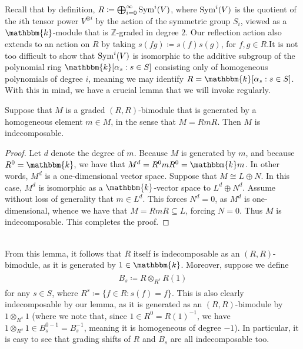 \noindent Recall that by definition, $R \coloneqq \bigoplus_{i=0}^\infty\textup{Sym}^i(V)$, where $\textup{Sym}^i(V)$ is the quotient of the $i$th tensor power $V^{\otimes i}$ by the action of the symmetric group $S_i$, viewed as a $\mathbbm{k}$-module that is $\mathbb{Z}$-graded in degree $2$. Our reflection action also extends to an action on $R$ by taking $s(fg) \coloneqq s(f)s(g)$, for $f, g \in R$.\linebreak It is not too difficult to show that $\textup{Sym}^i(V)$ is isomorphic to the additive subgroup of the polynomial ring $\mathbbm{k}[\alpha_s : s \in S]$ consisting only of homogeneous polynomials of degree $i$, meaning we may identify $R = \mathbbm{k}[\alpha_s : s \in S]$. With this in mind, we have a crucial lemma that we will invoke regularly.\\

\noindent\begin{lemma}\label{HomogeneousGenerator} Suppose that $M$ is a graded $(R, R)$-bimodule that is generated by a homogeneous element $m \in M$, in the sense that $M = RmR$. Then $M$ is indecomposable.\\
\end{lemma}

\noindent\begin{proof} Let $d$ denote the degree of $m$. Because $M$ is generated by $m$, and because $R^0 = \mathbbm{k}$, we have that $M^d = R^0mR^0 = \mathbbm{k}m$. In other words, $M^d$ is a one-dimensional vector space. Suppose that $M \cong L \oplus N$. In this case, $M^d$ is isomorphic as a $\mathbbm{k}$-vector space to $L^d \oplus N^d$. Assume without loss of generality that $m \in L^d$. This forces $N^d = 0$, as $M^d$ is one-dimensional, whence we have that $M = RmR \subseteq L$, forcing $N = 0$. Thus $M$ is indecomposable. This completes the proof.
\end{proof}\\

\noindent From this lemma, it follows that $R$ itself is indecomposable as an $(R, R)$-bimodule, as it is generated by $1 \in \mathbbm{k}$. Moreover, suppose we define
\begin{align*}
\begin{split}
B_s \coloneqq R \otimes_{R^s} R(1)
\end{split}
\end{align*}
\noindent for any $s \in S$, where $R^s \coloneqq \{f \in R : s(f) = f\}$. This is also clearly indecomposable by our lemma, as it is generated as an $(R, R)$-bimodule by $1 \otimes_{R^s} 1$ (where we note that, since $1 \in R^0 = R(1)^{-1}$, we have $1 \otimes_{R^s} 1 \in B_s^{0-1} = B_s^{-1}$, meaning it is homogeneous of degree $-1$). In particular, it is easy to see that grading shifts of $R$ and $B_s$ are all indecomposable too.\newpage

